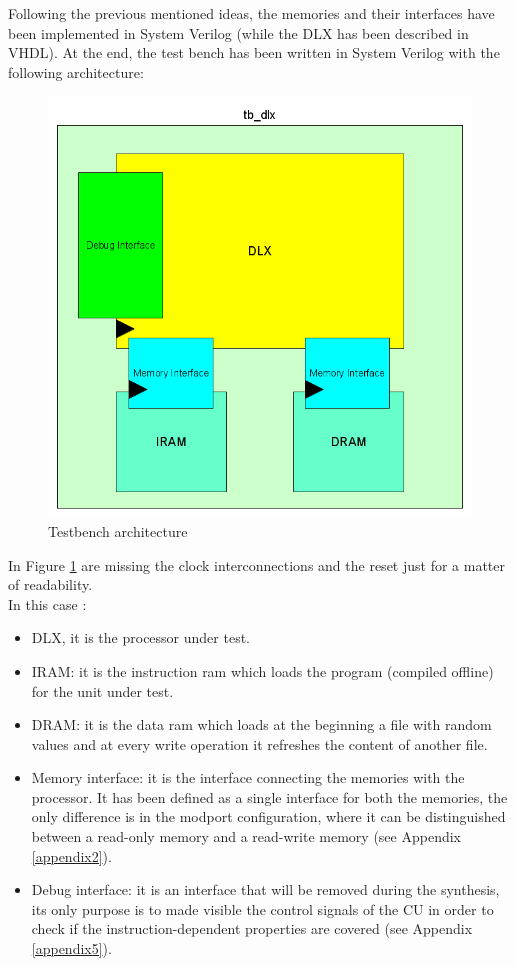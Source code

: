 Following the previous mentioned ideas, the memories and their interfaces have been implemented in System Verilog (while the DLX has been described in VHDL). At the end, the test bench has been written in System Verilog with the following architecture:
\begin{figure}[!htbp]
\centering
\captionsetup{justification=centering}
\includegraphics[scale=0.35,angle=0]{./chapters/figures/tb_dlx.png}
\caption{Testbench architecture}
\label{fig:tbdlx}
\end{figure}

In Figure \ref{fig:tbdlx} are missing the clock interconnections and the reset just for a matter of readability.\\ In this case :
\begin{itemize}
\item DLX, it is the processor under test.
\item IRAM: it is the instruction ram which loads the program (compiled offline) for the unit under test.
\item DRAM: it is the data ram which loads at the beginning a file with random values and at every write operation it refreshes the content of another file.
\item Memory interface: it is the interface connecting the memories with the processor. It has been defined as a single interface for both the memories, the only difference is in the modport configuration, where it can be distinguished between a read-only memory and a read-write memory (see Appendix \ref{appendix2}).
\item Debug interface: it is an interface that will be removed during the synthesis, its only purpose is to made visible the control signals of the CU in order to check if the instruction-dependent properties are covered (see Appendix \ref{appendix5}).
\end{itemize}

